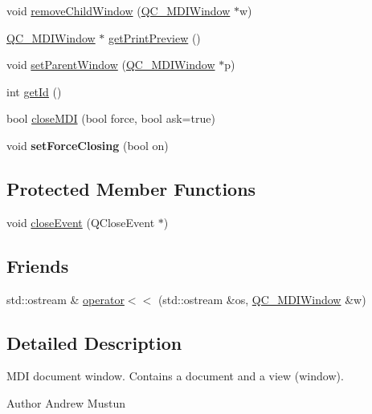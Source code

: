 \begin{DoxyCompactItemize}
void \hyperlink{classQC__MDIWindow_a262f2a2bbb0e3614d4dcf3a6c1b097fd}{remove\-Child\-Window} (\hyperlink{classQC__MDIWindow}{Q\-C\-\_\-\-M\-D\-I\-Window} $\ast$w)
\item 
\hyperlink{classQC__MDIWindow}{Q\-C\-\_\-\-M\-D\-I\-Window} $\ast$ \hyperlink{classQC__MDIWindow_ace3f26e808c4238af24118f733ac2844}{get\-Print\-Preview} ()
\item 
void \hyperlink{classQC__MDIWindow_a5519064274ba3ffeda4e498b314d2ad5}{set\-Parent\-Window} (\hyperlink{classQC__MDIWindow}{Q\-C\-\_\-\-M\-D\-I\-Window} $\ast$p)
\item 
int \hyperlink{classQC__MDIWindow_a4d6098bf524cbad43e2908921c296b9b}{get\-Id} ()
\item 
bool \hyperlink{classQC__MDIWindow_ac70defb958de6274026046978ead826a}{close\-M\-D\-I} (bool force, bool ask=true)
\item 
\hypertarget{classQC__MDIWindow_aeab5b869401173964556c9c2d0a10262}{void {\bfseries set\-Force\-Closing} (bool on)}\label{classQC__MDIWindow_aeab5b869401173964556c9c2d0a10262}

\end{DoxyCompactItemize}
\subsection*{Protected Member Functions}
\begin{DoxyCompactItemize}
\item 
void \hyperlink{classQC__MDIWindow_a6ed9db29181ad41ec3c81e086379a5fa}{close\-Event} (Q\-Close\-Event $\ast$)
\end{DoxyCompactItemize}
\subsection*{Friends}
\begin{DoxyCompactItemize}
\item 
std\-::ostream \& \hyperlink{classQC__MDIWindow_a5cca2f4504cf601790068d4a1f6a6cf0}{operator$<$$<$} (std\-::ostream \&os, \hyperlink{classQC__MDIWindow}{Q\-C\-\_\-\-M\-D\-I\-Window} \&w)
\end{DoxyCompactItemize}


\subsection{Detailed Description}
M\-D\-I document window. Contains a document and a view (window).

\begin{DoxyAuthor}{Author}
Andrew Mustun 
\end{DoxyAuthor}


